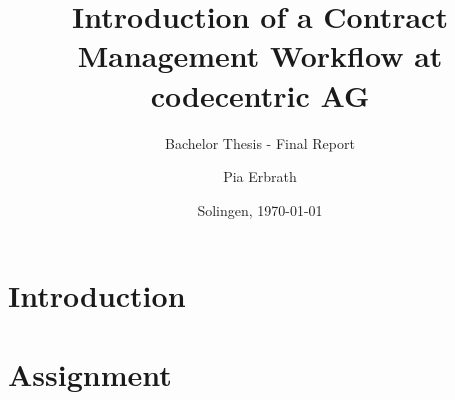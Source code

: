 

\usepackage[pagewise,modulo]{lineno}

\usepackage{pdfpages}

\title{Introduction of a Contract Management Workflow \newline at codecentric AG}
\subtitle{Bachelor Thesis - Final Report}
\author{Pia Erbrath}
\def\place{Solingen}
\date{\place, \today}

\def\documentname{Final Report for Bachelor Thesis}
\def\studentname{Pia Erbrath}
\def\snumber{2300869}
\def\course{Informatics - Software Engineering}
\def\period{February 2018 - July 2018}
\def\companyname{codecentric AG}
\def\companyaddress{Hochstr. 11}
\def\companypostcodecity{42697, Solingen}
\def\companycountry{Germany}
\def\companycoach{Niko Bl\"attermann}
\def\companycoachmail{niko.blaettermann@codecentric.de}
\def\universitytutor{Ferd van Odenhoven}
\def\universitytutormail{f.vanodenhoven@fontys.nl}
\def\examinator{C. Holz}
\def\externalexpert{H. Schuren}
\def\hasnda{no}

\setlength{\glsdescwidth}{0.8\textwidth}


\makeglossaries



	\maketitle
	\pagestyle{plain}
	
	\newpage
	
	\newpage
	
	\newpage
	
	\tableofcontents
	\listoftables
	\listoffigures
	\lstlistoflistings
	\newpage
	
	\newpage
	\pagestyle{ownstyle}
	
	\chapter{Introduction}
	\label{ch:introduction}
	
	
	\chapter{Assignment}
	\label{ch:assignment}
	
	
